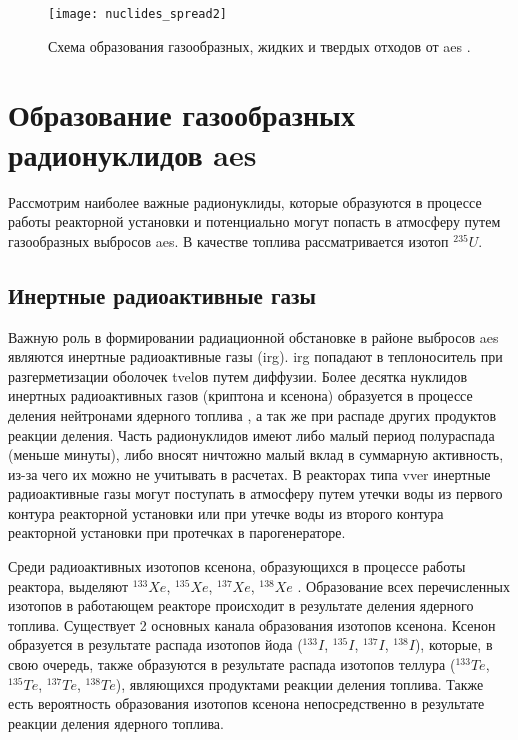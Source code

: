 \begin{figure}[ht]
	\centering
	\texttt{[image: nuclides\_spread2]}
	\captionsetup{justification=centering}
    \caption{Схема образования газообразных, жидких и твердых отходов от \ac{aes} \cite{bekman_nuclear}.}
    \label{fig_nuclides_spread2}
\end{figure}

\section{Образование газообразных радионуклидов \ac{aes}}
\label{sec_gas_nuclides}

Рассмотрим наиболее важные радионуклиды, которые образуются в процессе работы реакторной установки и потенциально 
могут попасть в атмосферу путем газообразных выбросов \ac{aes}. В качестве топлива рассматривается изотоп $^{235}U$.

\subsection{Инертные радиоактивные газы}

Важную роль в формировании радиационной обстановке в районе выбросов \ac{aes} являются инертные радиоактивные газы 
(\ac{irg}). \ac{irg} попадают в теплоноситель при разгерметизации оболочек \ac{tvel}ов путем диффузии. Более десятка 
нуклидов инертных радиоактивных газов (криптона и ксенона) образуется в процессе деления нейтронами ядерного топлива 
\cite{bekman_nuclear}, а так же при распаде других продуктов реакции деления. Часть радионуклидов имеют либо малый 
период полураспада (меньше минуты), либо вносят ничтожно малый вклад в суммарную активность, из-за чего их можно не 
учитывать в расчетах. В реакторах типа \ac{vver} инертные радиоактивные газы могут поступать в атмосферу путем утечки 
воды из первого контура реакторной установки или при утечке воды из второго контура реакторной установки при протечках в 
парогенераторе.

Среди радиоактивных изотопов ксенона, образующихся в процессе работы реактора, выделяют $^{133}Xe$, $^{135}Xe$, $^{137}Xe$, 
$^{138}Xe$ \cite{gusev_bio}. Образование всех перечисленных изотопов в работающем реакторе происходит в результате деления 
ядерного топлива. Существует 2 основных канала образования изотопов ксенона. Ксенон образуется в результате распада 
изотопов йода ($^{133}I$, $^{135}I$, $^{137}I$, $^{138}I$), которые, в свою очередь, также образуются в результате распада 
изотопов теллура ($^{133}Te$, $^{135}Te$, $^{137}Te$, $^{138}Te$), являющихся продуктами реакции деления топлива. Также 
есть вероятность образования изотопов ксенона непосредственно в результате реакции деления ядерного топлива.

